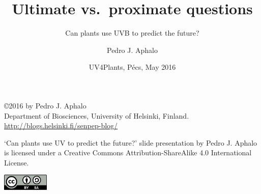 \documentclass[10pt]{beamer}\usepackage[]{graphicx}\usepackage[]{color}
\begin{document}

\title{Ultimate vs.\ proximate questions}
\subtitle{Can plants use UVB to predict the future?}
\author{Pedro J. Aphalo}
\date{UV4Plants, Pécs, May 2016}


	\begin{frame}
		\maketitle
	\end{frame}

	\begin{frame}[c]
		\begin{center}
			\begin{small}
				\copyright 2016 by Pedro J. Aphalo\\
				Department of Biosciences, University of Helsinki, Finland.\\
				\textcolor{blue}{\url{http://blogs.helsinki.fi/senpep-blog/}}\\[2ex]
			\end{small}

			\begin{footnotesize}
				`Can plants use UV to predict the future?' slide presentation by Pedro J. Aphalo is licensed under a Creative Commons Attribution-ShareAlike 4.0 International License.\\[2ex]

			\end{footnotesize}

			\includegraphics[width=6em]{figures/by-sa}
		\end{center}
	\end{frame}
\end{document}
